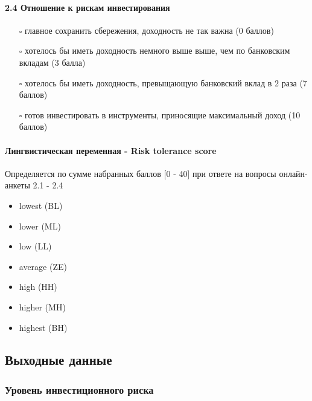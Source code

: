 \documentclass[11pt]{article}
\providecommand{\tightlist}{%
      \setlength{\itemsep}{0pt}\setlength{\parskip}{0pt}}
\begin{document}
\paragraph{2.4 Отношение к рискам
инвестирования}\label{ux43eux442ux43dux43eux448ux435ux43dux438ux435-ux43a-ux440ux438ux441ux43aux430ux43c-ux438ux43dux432ux435ux441ux442ux438ux440ux43eux432ux430ux43dux438ux44f}

\begin{itemize}
\tightlist
\item[$\square$]
  главное сохранить сбережения, доходность не так важна (0 баллов)
\item[$\square$]
  хотелось бы иметь доходность немного выше выше, чем по банковским
  вкладам (3 балла)
\item[$\square$]
  хотелось бы иметь доходность, превыщающую банковский вклад в 2 раза (7
  баллов)
\item[$\square$]
  готов инвестировать в инструменты, приносящие максимальный доход (10
  баллов)
\end{itemize}

\paragraph{Лингвистическая переменная - Risk tolerance
score}\label{ux43bux438ux43dux433ux432ux438ux441ux442ux438ux447ux435ux441ux43aux430ux44f-ux43fux435ux440ux435ux43cux435ux43dux43dux430ux44f---risk-tolerance-score}

Определяется по сумме набранных баллов {[}0 - 40{]} при ответе на
вопросы онлайн-анкеты 2.1 - 2.4

\begin{itemize}
\tightlist
\item
  lowest (BL)
\item
  lower (ML)
\item
  low (LL)
\item
  average (ZE)
\item
  high (HH)
\item
  higher (MH)
\item
  highest (BH)
\end{itemize}

\subsection{Выходные
данные}\label{ux432ux44bux445ux43eux434ux43dux44bux435-ux434ux430ux43dux43dux44bux435}

\subsubsection{Уровень инвестиционного
риска}\label{ux443ux440ux43eux432ux435ux43dux44c-ux438ux43dux432ux435ux441ux442ux438ux446ux438ux43eux43dux43dux43eux433ux43e-ux440ux438ux441ux43aux430}
\end{document}
